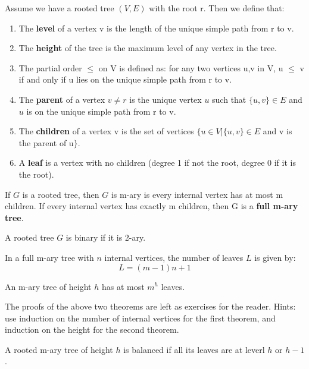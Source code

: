 \documentclass[oneside]{book}
\begin{document}
\begin{definition}
Assume we have a rooted tree $(V,E)$ with the root r. Then we define that:
\begin{enumerate}
    \item The \textbf{level} of a vertex v is the length of the unique simple path from r to v.
    \item The \textbf{height} of the tree is the maximum level of any vertex in the tree.
    \item The partial order $\leq$ on V is defined as: for any two vertices u,v in V, u $\leq$ v if and only if u lies on the unique simple path from r to v.
    \item The \textbf{parent} of a vertex $v \neq r$ is the unique vertex $u$ such that $\{u,v\} \in E$ and $u$ is on the unique simple path from r to v.
    \item The \textbf{children} of a vertex v is the set of vertices $\{u \in V | \{u,v\} \in E$ and v is the parent of u$\}$.
    \item A \textbf{leaf} is a vertex with no children (degree 1 if not the root, degree 0 if it is the root).
\end{enumerate}
\end{definition}

\begin{definition}
If $G$ is a rooted tree, then $G$ is m-ary is every internal vertex has at most m children. If every internal vertex has exactly m children, then G is a \textbf{full m-ary tree}.
\end{definition}

\begin{definition}
A rooted tree $G$ is binary if it is 2-ary.
\end{definition}

\begin{theorem}
In a full m-ary tree with $n$ internal vertices, the number of leaves $L$ is given by:
\[ L = (m-1)n + 1 \]
\end{theorem}

\begin{theorem}
An m-ary tree of height $h$ has at most $m^h$ leaves.
\end{theorem}

The proofs of the above two theorems are left as exercises for the reader. Hints: use induction on the number of internal vertices for the first theorem, and induction on the height for the second theorem.

\begin{definition}
A rooted m-ary tree of height $h$ is balanced if all its leaves are at leverl $h$ or $h-1$.
\end{definition}
\end{document}
